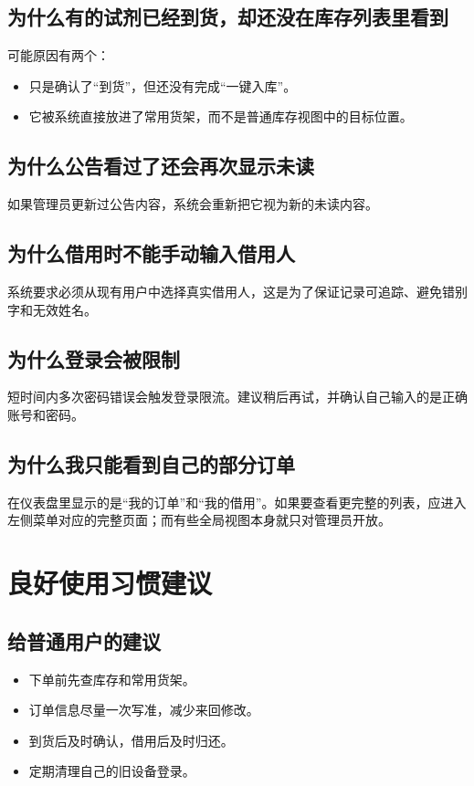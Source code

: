 \documentclass[12pt,a4paper]{ctexart}
\begin{document}
\subsection{为什么有的试剂已经到货，却还没在库存列表里看到}
可能原因有两个：
\begin{itemize}
  \item 只是确认了“到货”，但还没有完成“一键入库”。
  \item 它被系统直接放进了常用货架，而不是普通库存视图中的目标位置。
\end{itemize}

\subsection{为什么公告看过了还会再次显示未读}
如果管理员更新过公告内容，系统会重新把它视为新的未读内容。

\subsection{为什么借用时不能手动输入借用人}
系统要求必须从现有用户中选择真实借用人，这是为了保证记录可追踪、避免错别字和无效姓名。

\subsection{为什么登录会被限制}
短时间内多次密码错误会触发登录限流。建议稍后再试，并确认自己输入的是正确账号和密码。

\subsection{为什么我只能看到自己的部分订单}
在仪表盘里显示的是“我的订单”和“我的借用”。如果要查看更完整的列表，应进入左侧菜单对应的完整页面；而有些全局视图本身就只对管理员开放。

\newpage
\section{良好使用习惯建议}

\subsection{给普通用户的建议}
\begin{itemize}
  \item 下单前先查库存和常用货架。
  \item 订单信息尽量一次写准，减少来回修改。
  \item 到货后及时确认，借用后及时归还。
  \item 定期清理自己的旧设备登录。
\end{itemize}
\end{document}
